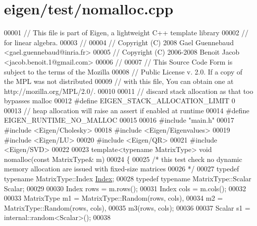 \hypertarget{eigen_2test_2nomalloc_8cpp_source}{}\section{eigen/test/nomalloc.cpp}
\label{eigen_2test_2nomalloc_8cpp_source}

\begin{DoxyCode}
00001 \textcolor{comment}{// This file is part of Eigen, a lightweight C++ template library}
00002 \textcolor{comment}{// for linear algebra.}
00003 \textcolor{comment}{//}
00004 \textcolor{comment}{// Copyright (C) 2008 Gael Guennebaud <gael.guennebaud@inria.fr>}
00005 \textcolor{comment}{// Copyright (C) 2006-2008 Benoit Jacob <jacob.benoit.1@gmail.com>}
00006 \textcolor{comment}{//}
00007 \textcolor{comment}{// This Source Code Form is subject to the terms of the Mozilla}
00008 \textcolor{comment}{// Public License v. 2.0. If a copy of the MPL was not distributed}
00009 \textcolor{comment}{// with this file, You can obtain one at http://mozilla.org/MPL/2.0/.}
00010 
00011 \textcolor{comment}{// discard stack allocation as that too bypasses malloc}
00012 \textcolor{preprocessor}{#define EIGEN\_STACK\_ALLOCATION\_LIMIT 0}
00013 \textcolor{comment}{// heap allocation will raise an assert if enabled at runtime}
00014 \textcolor{preprocessor}{#define EIGEN\_RUNTIME\_NO\_MALLOC}
00015 
00016 \textcolor{preprocessor}{#include "main.h"}
00017 \textcolor{preprocessor}{#include <Eigen/Cholesky>}
00018 \textcolor{preprocessor}{#include <Eigen/Eigenvalues>}
00019 \textcolor{preprocessor}{#include <Eigen/LU>}
00020 \textcolor{preprocessor}{#include <Eigen/QR>}
00021 \textcolor{preprocessor}{#include <Eigen/SVD>}
00022 
00023 \textcolor{keyword}{template}<\textcolor{keyword}{typename} MatrixType> \textcolor{keywordtype}{void} nomalloc(\textcolor{keyword}{const} MatrixType& m)
00024 \{
00025   \textcolor{comment}{/* this test check no dynamic memory allocation are issued with fixed-size matrices}
00026 \textcolor{comment}{  */}
00027   \textcolor{keyword}{typedef} \textcolor{keyword}{typename} MatrixType::Index \hyperlink{namespace_eigen_a62e77e0933482dafde8fe197d9a2cfde}{Index};
00028   \textcolor{keyword}{typedef} \textcolor{keyword}{typename} MatrixType::Scalar Scalar;
00029 
00030   Index rows = m.rows();
00031   Index cols = m.cols();
00032 
00033   MatrixType m1 = MatrixType::Random(rows, cols),
00034              m2 = MatrixType::Random(rows, cols),
00035              m3(rows, cols);
00036 
00037   Scalar s1 = internal::random<Scalar>();
00038 

\end{DoxyCode}

